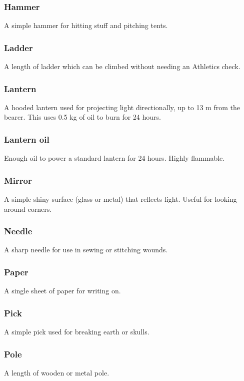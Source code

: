 \documentclass[a4paper,11pt,oneside]{book}
\newcommand{\textlf}[1]{\textbf{\titlecap{#1}}}
\begin{document}
\subsubsection*{Hammer}
A simple hammer for hitting stuff and pitching tents.

\subsubsection*{Ladder}
A length of ladder which can be climbed without needing an Athletics check.

\subsubsection*{Lantern}
A hooded lantern used for projecting \textlf{full} light directionally, up to 13 m from the bearer. This uses 0.5 kg of oil to burn for 24 hours.

\subsubsection*{Lantern oil}
Enough oil to power a standard lantern for 24 hours. Highly flammable.

\subsubsection*{Mirror}
A simple shiny surface (glass or metal) that reflects light. Useful for looking around corners.

\subsubsection*{Needle}
A sharp needle for use in sewing or stitching wounds.

\subsubsection*{Paper}
A single sheet of paper for writing on.

\subsubsection*{Pick}
A simple pick used for breaking earth or skulls.

\subsubsection*{Pole}
A length of wooden or metal pole.
\end{document}
